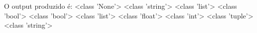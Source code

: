 \documentclass[12pt,varwidth=16cm,border=1pt]{standalone}
\begin{document}
O output produzido é:\newline
<class 'None'>\newline
<class 'string'>\newline
<class 'list'>\newline
<class 'bool'>\newline
<class 'bool'>\newline
<class 'list'>\newline
<class 'float'>\newline
<class 'int'>\newline
<class 'tuple'>\newline
<class 'string'>
\end{document}
